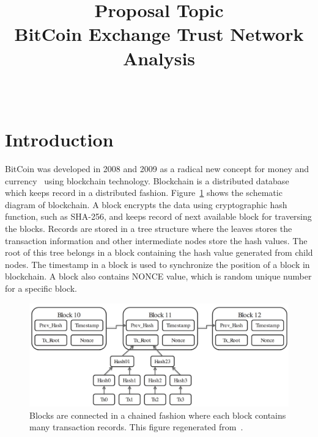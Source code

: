 \documentclass[onecolumn, 12pt]{IEEEtran}
\begin{document}
\title{Proposal Topic \\
BitCoin Exchange Trust Network Analysis
}

\author{\\
}

\maketitle
\section{Introduction}
BitCoin was developed in 2008 and 2009 as a radical new concept for money and currency~\cite{nakamoto2008bitcoin} using blockchain technology.
Blockchain is a distributed database which keeps record in a distributed fashion.
Figure~\ref{fig:blkchain} shows the schematic diagram of blockchain.
A block encrypts the data using cryptographic hash function, such as SHA-256, and keeps record of next available block for traversing the blocks.
Records are stored in a tree structure where the leaves stores the transaction information and other intermediate nodes store the hash values. The root of this tree belongs in a block containing the hash value generated from child nodes.
The timestamp in a block is used to synchronize the position of a block in blockchain.
A block also contains NONCE value, which is random unique number for a specific block.
\begin{figure}[htbp]
\centerline{\includegraphics[width=\columnwidth]{blockchain.jpeg}}
\caption{Blocks are connected in a chained fashion where each block contains
many transaction records. This figure regenerated from~\cite{blkchaindiag}.}

\label{fig:blkchain}
\end{figure}
\end{document}
